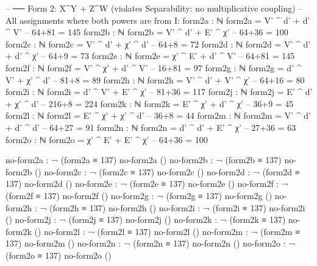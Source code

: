 \documentclass[11pt,a4paper]{article}
\begin{document}
\begin{code}
-- ── Form 2: X^Y + Z^W  (violates Separability: no multiplicative coupling)
-- All assignments where both powers are from I:
form2a : ℕ
form2a = V' ^ d' + d' ^ V'                 -- 64+81 = 145
form2b : ℕ
form2b = V' ^ d' + E' ^ χ'                 -- 64+36 = 100
form2c : ℕ
form2c = V' ^ d' + χ' ^ d'                 -- 64+8 = 72
form2d : ℕ
form2d = V' ^ d' + d' ^ χ'                 -- 64+9 = 73
form2e : ℕ
form2e = χ' ^ E' + d' ^ V'                 -- 64+81 = 145
form2f : ℕ
form2f = V' ^ χ' + d' ^ V'                 -- 16+81 = 97
form2g : ℕ
form2g = d' ^ V' + χ' ^ d'                 -- 81+8 = 89
form2h : ℕ
form2h = V' ^ d' + V' ^ χ'                 -- 64+16 = 80
form2i : ℕ
form2i = d' ^ V' + E' ^ χ'                 -- 81+36 = 117
form2j : ℕ
form2j = E' ^ d' + χ' ^ d'                 -- 216+8 = 224
form2k : ℕ
form2k = E' ^ χ' + d' ^ χ'                 -- 36+9 = 45
form2l : ℕ
form2l = E' ^ χ' + χ' ^ d'                 -- 36+8 = 44
form2m : ℕ
form2m = V' ^ d' + d' ^ d'                 -- 64+27 = 91
form2n : ℕ
form2n = d' ^ d' + E' ^ χ'                 -- 27+36 = 63
form2o : ℕ
form2o = χ' ^ E' + E' ^ χ'                 -- 64+36 = 100

no-form2a : ¬ (form2a ≡ 137)
no-form2a ()
no-form2b : ¬ (form2b ≡ 137)
no-form2b ()
no-form2c : ¬ (form2c ≡ 137)
no-form2c ()
no-form2d : ¬ (form2d ≡ 137)
no-form2d ()
no-form2e : ¬ (form2e ≡ 137)
no-form2e ()
no-form2f : ¬ (form2f ≡ 137)
no-form2f ()
no-form2g : ¬ (form2g ≡ 137)
no-form2g ()
no-form2h : ¬ (form2h ≡ 137)
no-form2h ()
no-form2i : ¬ (form2i ≡ 137)
no-form2i ()
no-form2j : ¬ (form2j ≡ 137)
no-form2j ()
no-form2k : ¬ (form2k ≡ 137)
no-form2k ()
no-form2l : ¬ (form2l ≡ 137)
no-form2l ()
no-form2m : ¬ (form2m ≡ 137)
no-form2m ()
no-form2n : ¬ (form2n ≡ 137)
no-form2n ()
no-form2o : ¬ (form2o ≡ 137)
no-form2o ()
\end{code}
\end{document}
